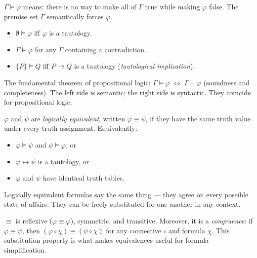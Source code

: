 \begin{remark}
$\Gamma \models \varphi$ means: there is no way to make all of $\Gamma$ true
while making $\varphi$ false. The premise set $\Gamma$ semantically forces $\varphi$.
\end{remark}

\begin{remark}
\begin{itemize}
  \item $\emptyset \models \varphi$ iff $\varphi$ is a tautology.
  \item $\Gamma \models \varphi$ for any $\Gamma$ containing a contradiction.
  \item $\{P\} \models Q$ iff $P \rightarrow Q$ is a tautology
        (\emph{tautological implication}).
\end{itemize}
\end{remark}

\begin{remark}
The fundamental theorem of propositional logic:
$\Gamma \models \varphi \;\Leftrightarrow\; \Gamma \vdash \varphi$ (soundness and completeness).
The left side is semantic; the right side is syntactic. They coincide for
propositional logic.
\end{remark}

\begin{tcolorbox}[colback=propbox, colframe=propborder, arc=2pt,
  left=6pt, right=6pt, top=4pt, bottom=4pt,
  title={\small\textbf{Definition (Logical Equivalence)}},
  fonttitle=\small\bfseries]
\label{def:pl-log-equiv}
$\varphi$ and $\psi$ are \emph{logically equivalent}, written $\varphi \equiv \psi$,
if they have the same truth value under every truth assignment. Equivalently:
\begin{itemize}
  \item $\varphi \models \psi$ and $\psi \models \varphi$, or
  \item $\varphi \leftrightarrow \psi$ is a tautology, or
  \item $\varphi$ and $\psi$ have identical truth tables.
\end{itemize}
\end{tcolorbox}

\begin{remark}[Intuition]
Logically equivalent formulas say the same thing — they agree on every possible
state of affairs. They can be freely substituted for one another in any context.
\end{remark}

\begin{remark}
$\equiv$ is reflexive ($\varphi \equiv \varphi$), symmetric, and transitive.
Moreover, it is a \emph{congruence}: if $\varphi \equiv \psi$, then
$(\varphi \circ \chi) \equiv (\psi \circ \chi)$ for any connective $\circ$ and
formula $\chi$. This substitution property is what makes equivalences useful
for formula simplification.
\end{remark}
